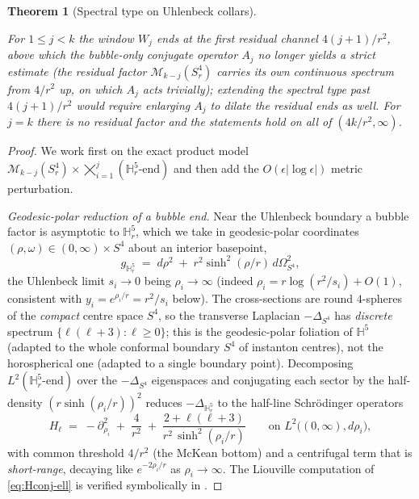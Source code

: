 \documentclass[11pt,letterpaper]{article}
\newtheorem{theorem}{Theorem}[section]
\theoremstyle{definition}
\newcommand{\bbH}{\mathbb{H}}
\newcommand{\cM}{\mathcal{M}}
\newcommand{\Lap}{\Delta}
\begin{document}
\begin{theorem}[Spectral type on Uhlenbeck collars]
\begin{enumerate}
\end{enumerate}
For $1\le j<k$ the window $W_j$ ends at the first residual channel $4(j+1)/r^2$, above which the bubble-only conjugate operator $A_j$ no longer yields a strict estimate (the residual factor $\cM_{k-j}(S^4_r)$ carries its own continuous spectrum from $4/r^2$ up, on which $A_j$ acts trivially); extending the spectral type past $4(j+1)/r^2$ would require enlarging $A_j$ to dilate the residual ends as well. For $j = k$ there is no residual factor and the statements hold on all of $(4k/r^2,\infty)$.
\end{theorem}

\begin{proof}
We work first on the exact product model $\cM_{k-j}(S^4_r)\times \bigtimes_{i=1}^j (\bbH^5_r\text{-end})$ and then add the $O(\epsilon|\log\epsilon|)$ metric perturbation.

\smallskip
\noindent\emph{Geodesic-polar reduction of a bubble end.} Near the Uhlenbeck boundary a bubble factor is asymptotic to $\bbH^5_r$, which we take in geodesic-polar coordinates $(\rho,\omega)\in(0,\infty)\times S^4$ about an interior basepoint,
\[
g_{\bbH^5_r} \;=\; d\rho^2 \;+\; r^2\sinh^2(\rho/r)\,d\Omega_{S^4}^2 ,
\]
the Uhlenbeck limit $s_i\to 0$ being $\rho_i\to\infty$ (indeed $\rho_i = r\log(r^2/s_i) + O(1)$, consistent with $y_i = e^{\rho_i/r} = r^2/s_i$ below). The cross-sections are round $4$-spheres of the \emph{compact} centre space $S^4$, so the transverse Laplacian $-\Lap_{S^4}$ has \emph{discrete} spectrum $\{\ell(\ell+3):\ell\ge 0\}$; this is the geodesic-polar foliation of $\bbH^5$ (adapted to the whole conformal boundary $S^4$ of instanton centres), not the horospherical one (adapted to a single boundary point). Decomposing $L^2(\bbH^5_r\text{-end})$ over the $-\Lap_{S^4}$ eigenspaces and conjugating each sector by the half-density $(r\sinh(\rho_i/r))^{2}$ reduces $-\Lap_{\bbH^5_r}$ to the half-line Schr\"odinger operators
\begin{equation}\label{eq:Hconj-ell}
H_\ell \;=\; -\partial_{\rho_i}^2 \;+\; \frac{4}{r^2} \;+\; \frac{2 + \ell(\ell+3)}{r^2\,\sinh^2(\rho_i/r)}\qquad\text{on } L^2\bigl((0,\infty),d\rho_i\bigr),
\end{equation}
with common threshold $4/r^2$ (the McKean bottom) and a centrifugal term that is \emph{short-range}, decaying like $e^{-2\rho_i/r}$ as $\rho_i\to\infty$. The Liouville computation of \eqref{eq:Hconj-ell} is verified symbolically in \cite{mourre-geodesic-script}.


\end{proof}
\end{document}
